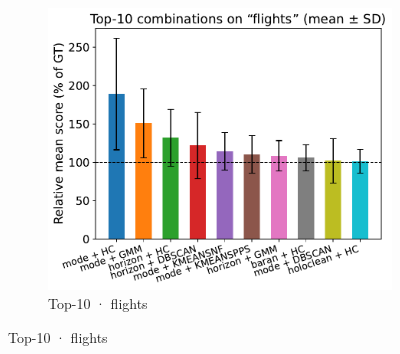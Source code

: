 \documentclass[10pt]{article} %
\numberwithin{equation}{section}
\begin{document}
\begin{figure}[htbp]
\begin{subfigure}{0.34\linewidth}
    \centering
    \includegraphics[width=\linewidth]{figures/5.3.1graph/top10_bar_error_flights.pdf}
    \caption{Top-10 · flights}
  \end{subfigure}


\end{figure}
\end{document}
